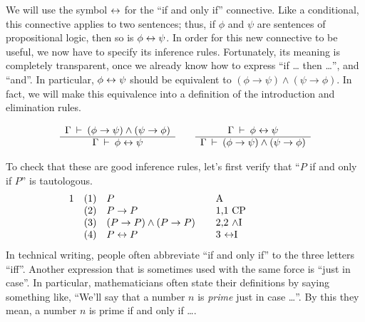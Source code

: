 We will use the symbol $\lra$ for the ``if and only if'' connective.
Like a conditional, this connective applies to two sentences; thus, if
$\phi$ and $\psi$ are sentences of propositional logic, then so is
$\phi\leftrightarrow\psi$.  In order for this new connective to be useful, we now
have to specify its inference rules.  Fortunately, its meaning is
completely transparent, once we already know how to express ``if \dots
then \dots '', and ``and''.  In particular, $\phi\leftrightarrow\psi$ should be
equivalent to $(\phi\to\psi )\wedge (\psi\to\phi )$.  In fact, we will
make this equivalence into a definition of the introduction and
elimination rules.


\bigskip 
\begin{tcolorbox}[enhanced,width=11cm,title=biconditional introduction
  ($\lra$I) and elimination ($\lra$E),attach boxed title to top
  left={yshift=-2mm,xshift=4mm},boxed title style={sharp corners}]
\[ \begin{array}{c c c}  \begin{array}{c c} \Gamma\:\vdash\: (\phi\to \psi)\wedge (\psi\to \phi) \\
                              \hline \Gamma\:\vdash\: \phi\leftrightarrow \psi \end{array} & &
                                                                                 \begin{array}{c c} \Gamma\:\vdash\: \phi\leftrightarrow \psi \\ \hline
\Gamma\:\vdash\: (\phi\to \psi )\wedge (\psi\to \phi ) \end{array} \end{array} \]                                                                                   
\end{tcolorbox}
\bigskip 

To check that these are good inference rules, let's first verify that
``$P$ if and only if $P$'' is tautologous.
\[ \begin{array}{l l >{$}p{3.5cm}<{$} p{3cm}}
1 & (1) & P & A \\
  & (2) & P\to P & 1,1 CP \\
  & (3) & (P\to P)\wedge (P\to P) & 2,2 $\wedge$I \\
  & (4) & P\lra P  & 3 $\lra$I \end{array} \]
In technical writing, people often abbreviate ``if and only if'' to
the three letters ``iff''.  Another expression that is sometimes used 
with the same force is ``just in case''.  In particular,
mathematicians often state their definitions by saying something like,
``We'll say that a number $n$ is {\it prime} just in case \dots ''.
By this they mean, a number $n$ is prime if and only if \dots .

